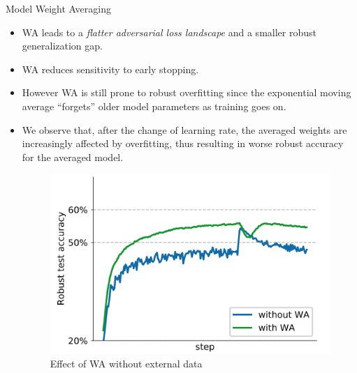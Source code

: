 \begin{frame}{Model Weight Averaging}
    \begin{itemize}[<+-| alert@+>] %
        \item WA leads to a \emph{flatter adversarial loss landscape} and a smaller robust generalization gap.
        \item WA reduces sensitivity to early stopping. 
        \item However WA is still prone to robust overfitting since the exponential moving average “forgets” older model parameters as training goes on.
        \item We observe that, after the change of learning rate, the averaged weights are increasingly affected by overfitting, thus resulting in worse robust accuracy for the averaged model.
        \begin{figure}
            \centering
            \includegraphics[height=.4\textheight]{pic/weight_averaging.png}
            \caption{Effect of WA without external data}
            \centering
            \label{fig:weight_averaging}
        \end{figure}
    \end{itemize}
\end{frame}

